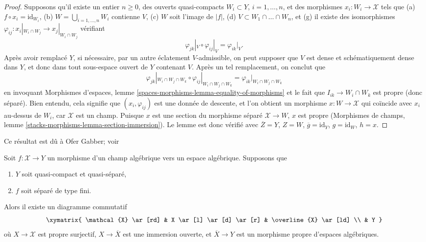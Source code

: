 \begin{proof}
\medskip\noindent
Supposons qu'il existe un entier $n \geq 0$, des ouverts quasi-compacts
$W_i \subset Y$, $i = 1, \ldots, n$, et des
morphismes $x_i : W_i \to \mathcal{X}$ tels que
(a) $f \circ x_i = \text{id}_{W_i}$,
(b) $W = \bigcup_{i = 1, \ldots, n} W_i$ contienne $V$,
(c) $W$ soit l'image de $|f|$,
(d) $V \subset W_1 \cap \ldots \cap W_n$, et
(g) il existe des isomorphismes
$\varphi_{ij} : x_i|_{W_i \cap W_j} \to x_j|_{W_i \cap W_j}$
vérifiant
$$
\varphi_{jk}|_V \circ \varphi_{ij}|_V = \varphi_{ik}|_V.
$$
Après avoir remplacé $Y$, si nécessaire, par un autre éclatement $V$-admissible,
on peut supposer que $V$ est dense et schématiquement dense
dans $Y$, et donc dans tout sous-espace ouvert de $Y$ contenant $V$.
Après un tel remplacement, on conclut que
$$
\varphi_{jk}|_{W_i \cap W_j \cap W_k} \circ
\varphi_{ij}|_{W_i \cap W_j \cap W_k} =
\varphi_{ik}|_{W_i \cap W_j \cap W_k}
$$
en invoquant Morphismes d'espaces, lemme
\ref{spaces-morphisms-lemma-equality-of-morphisms}
et le fait que $I_{ik} \to W_i \cap W_k$ est propre
(donc séparé).
Bien entendu, cela signifie que $(x_i, \varphi_{ij})$
est une donnée de descente, et l'on obtient un morphisme
$x : W \to \mathcal{X}$ qui coïncide avec $x_i$ au-dessus de $W_i$,
car $\mathcal{X}$ est un champ.
Puisque $x$ est une section du morphisme séparé
$\mathcal{X} \to W$, $x$ est propre
(Morphismes de champs, lemme \ref{stacks-morphisms-lemma-section-immersion}).
Le lemme est donc vérifié avec $\overline{Z} = Y$,
$Z = W$, $\overline{g} = \text{id}_Y$, $g = \text{id}_W$,
$h = x$.
\end{proof}

\begin{theorem}
\label{theorem-chow-finite-type}
\begin{reference}
Ce résultat est dû à Ofer Gabber; voir
\cite[Theorem 1.1]{olsson_proper}
\end{reference}
Soit $f : \mathcal{X} \to Y$ un morphisme d'un champ algébrique
vers un espace algébrique. Supposons que
\begin{enumerate}
\item $Y$ soit quasi-compact et quasi-séparé,
\item $f$ soit séparé de type fini.
\end{enumerate}
Alors il existe un diagramme commutatif
$$
\xymatrix{
\mathcal{X} \ar[rd] & X \ar[l] \ar[d] \ar[r] & \overline{X} \ar[ld] \\
& Y
}
$$
où $X \to \mathcal{X}$ est propre surjectif,
$X \to \overline{X}$ est une immersion ouverte, et
$\overline{X} \to Y$ est un morphisme propre d'espaces algébriques.
\end{theorem}

